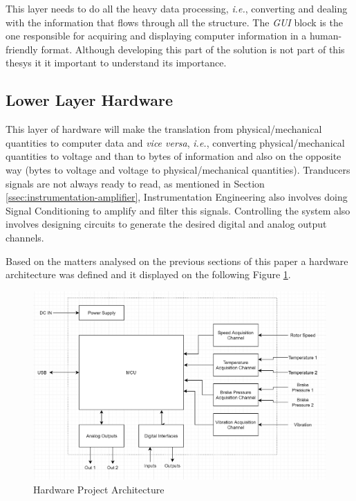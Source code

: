 		This layer needs to do all the heavy data processing, \textit{i.e.}, converting and dealing with the information that flows through all the structure. The \textit{GUI} block is the one responsible for acquiring and displaying computer information in a human-friendly format. Although developing this part of the solution is not part of this thesys it it important to understand its importance.

	\subsection{Lower Layer Hardware}\label{ssec:lowerLayerlHardware}

		This layer of hardware will make the translation from physical/mechanical quantities to computer data and \textit{vice versa}, \textit{i.e.}, converting physical/mechanical quantities to voltage and than to bytes of information and also on the opposite way (bytes to voltage and voltage to physical/mechanical quantities). Tranducers signals are not always ready to read, as mentioned in Section \ref{ssec:instrumentation-amplifier}, Instrumentation Engineering also involves doing Signal Conditioning to amplify and filter this signals. Controlling the system also involves designing circuits to generate the desired digital and analog output channels.
		\par
		Based on the matters analysed on the previous sections of this paper a hardware architecture was defined and it displayed on the following Figure \ref{fig:hardwareProject}.
	
		\begin{figure}[htbp]
			\centering
			\includegraphics[width=.8\textwidth]{figuras/fig-hardwareProject}
			\caption{Hardware Project Architecture}
			\label{fig:hardwareProject}
		\end{figure}


